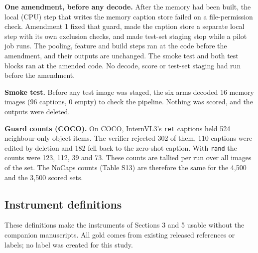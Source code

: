 \textbf{One amendment, before any decode.} After the memory had been built, the local (CPU) step
that writes the memory caption store failed on a file-permission check. Amendment 1 fixed that
guard, made the caption store a separate local step with its own exclusion checks, and made test-set
staging stop while a pilot job runs. The pooling, feature and build steps ran at the code before the
amendment, and their outputs are unchanged. The smoke test and both test blocks ran at the amended
code. No decode, score or test-set staging had run before the amendment.

\textbf{Smoke test.} Before any test image was staged, the six arms decoded 16 memory images (96
captions, 0 empty) to check the pipeline. Nothing was scored, and the outputs were deleted.

\textbf{Guard counts (COCO).} On COCO, InternVL3's \texttt{ret} captions held 524 neighbour-only
object items. The verifier rejected 302 of them, 110 captions were edited by deletion and 182 fell
back to the zero-shot caption. With \texttt{rand} the counts were 123, 112, 39 and 73. These counts
are tallied per run over all images of the set. The NoCaps counts (Table S13) are therefore the same
for the 4,500 and the 3,500 scored sets.

\subsection{Instrument definitions}\label{instrument-definitions}

These definitions make the instruments of Sections 3 and 5 usable without the companion manuscripts.
All gold comes from existing released references or labels; no label was created for this study.

